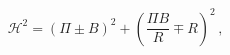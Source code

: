 \begin{equation}
  \mathcal{H}^2= \left(\Pi \pm B\right)^2+
  \left(\frac{\Pi B}{ R}\mp R\right)^2\,,
 \label{reH}
\end{equation}

